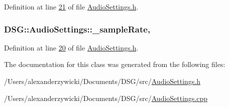 Definition at line \hyperlink{_audio_settings_8h_source_l00021}{21} of file \hyperlink{_audio_settings_8h_source}{Audio\+Settings.\+h}.

\hypertarget{class_d_s_g_1_1_audio_settings_a56869b51933f102b197f54001c8a1d27}{
\subsubsection[{\+\_\+sample\+Rate}]{ D\+S\+G\+::\+Audio\+Settings\+::\+\_\+sample\+Rate\hspace{0.3cm}{\ttfamily [static]}, {\ttfamily [protected]}}}\label{class_d_s_g_1_1_audio_settings_a56869b51933f102b197f54001c8a1d27}


Definition at line \hyperlink{_audio_settings_8h_source_l00020}{20} of file \hyperlink{_audio_settings_8h_source}{Audio\+Settings.\+h}.



The documentation for this class was generated from the following files\+:\begin{DoxyCompactItemize}
\item 
/\+Users/alexanderzywicki/\+Documents/\+D\+S\+G/src/\hyperlink{_audio_settings_8h}{Audio\+Settings.\+h}\item 
/\+Users/alexanderzywicki/\+Documents/\+D\+S\+G/src/\hyperlink{_audio_settings_8cpp}{Audio\+Settings.\+cpp}\end{DoxyCompactItemize}
